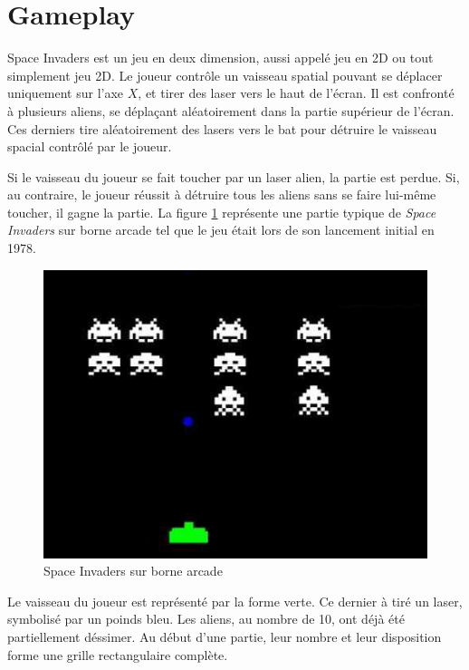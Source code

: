 \documentclass[french]{nakrule}
\begin{document}
\clearpage
\symmetricalPage

\section{Gameplay}
\label{sec:gameplay}

Space Invaders est un jeu en deux dimension, aussi appelé jeu en 2D ou tout
simplement jeu 2D. Le joueur contrôle un vaisseau spatial pouvant se déplacer
uniquement sur l'axe $X$, et tirer des laser vers le haut de l'écran. Il est
confronté à plusieurs aliens, se déplaçant aléatoirement dans la partie
supérieur de l'écran. Ces derniers tire aléatoirement des lasers vers le bat
pour détruire le vaisseau spacial contrôlé par le joueur.

Si le vaisseau du joueur se fait toucher par un laser alien, la partie est
perdue. Si, au contraire, le joueur réussit à détruire tous les aliens sans se
faire lui-même toucher, il gagne la partie. La figure \ref{gameOnArcade} représente une
partie typique de \emph{Space Invaders} sur borne arcade tel que le jeu était
lors de son lancement initial en 1978.

\begin{figure}[ht]
  \centering
  \includegraphics[width=.6\textwidth]{pictures/gameOnArcade}
  \caption{Space Invaders sur borne arcade}
  \label{gameOnArcade}
\end{figure}

Le vaisseau du joueur est représenté par la forme verte. Ce dernier à tiré un
laser, symbolisé par un poinds bleu. Les aliens, au nombre de 10, ont déjà été
partiellement déssimer. Au début d'une partie, leur nombre et leur disposition
forme une grille rectangulaire complète.

\end{document}
